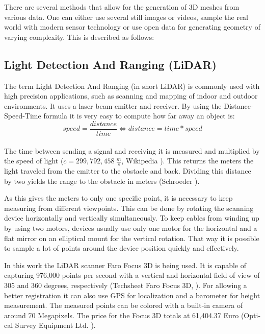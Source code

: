 There are several methods that allow for the generation of 3D meshes from various data. One can either use several still images or videos, sample the real world with modern sensor technology or use open data for generating geometry of varying complexity. This is described as follows:

\subsection{Light Detection And Ranging (LiDAR)}

The term Light Detection And Ranging (in short LiDAR) is commonly used with high precision applications, such as scanning and mapping of indoor and outdoor environments. It uses a laser beam emitter and receiver. By using the Distance-Speed-Time formula it is very easy to compute how far away an object is:\\

$$  speed = \dfrac{distance}{time} \Longleftrightarrow distance = time * speed $$\\
The time between sending a signal and receiving it is measured and multiplied by the speed of light ($c = 299,792,458 \medspace \frac{m}{s}$, Wikipedia \parencite{wiki:SpeedOfLight}). This returns the meters the light traveled from the emitter to the obstacle and back. Dividing this distance by two yields the range to the obstacle in meters (Schroeder \parencite[see][p8-9]{dp_lidar}).

As this gives the meters to only one specific point, it is necessary to keep measuring from different viewpoints. This can be done by rotating the scanning device horizontally and vertically simultaneously. To keep cables from winding up by using two motors, devices usually use only one motor for the horizontal and a flat mirror on an elliptical mount for the vertical rotation. That way it is possible to sample a lot of points around the device position quickly and effectively.

In this work the LiDAR scanner Faro Focus 3D is being used. It is capable of capturing 976,000 points per second with a vertical and horizontal field of view of 305 and 360 degrees, respectively (Techsheet Faro Focus 3D, \parencite{faro_techsheet}). For allowing a better registration it can also use GPS for localization and a barometer for height measurement. The measured points can be colored with a built-in camera of around 70 Megapixels. The price for the Focus 3D totals at 61,404.37 Euro (Opti-cal Survey Equipment Ltd. \parencite{survey_equipment}).

